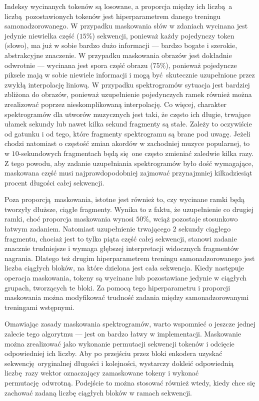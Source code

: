 Indeksy wycinanych tokenów są losowane, a proporcja między ich liczbą a liczbą pozostawionych tokenów jest hiperparametrem danego treningu samonadzorowanego. W przypadku maskowania słów w zdaniach \cite{devlin_bert_2019} wycinana jest jedynie niewielka część ($15\%$) sekwencji, ponieważ każdy pojedynczy token (słowo), ma już w sobie bardzo dużo informacji --- bardzo bogate i szerokie, abstrakcyjne znaczenie. W przypadku maskowania obrazów \cite{he_masked_2021} jest dokładnie odwrotnie --- wycinana jest spora część obrazu ($75\%$), ponieważ pojedyncze piksele mają w sobie niewiele informacji i mogą być skutecznie uzupełnione przez zwykłą interpolację liniową. W przypadku spektrogramów sytuacja jest bardziej zbliżona do obrazów, ponieważ uzupełnienie pojedynczych ramek również można zrealizować poprzez nieskomplikowaną interpolację. Co więcej, charakter spektrogramów dla utworów muzycznych jest taki, że często ich długie, trwające ułamek sekundy lub nawet kilka sekund fragmenty są stałe. Zależy to oczywiście od gatunku i od tego, które fragmenty spektrogramu są brane pod uwagę. Jeżeli chodzi natomiast o częstość zmian akordów w zachodniej muzyce popularnej, to w $10$-sekundowych fragmentach będą się one często zmieniać zaledwie kilka razy. Z tego powodu, aby zadanie uzupełniania spektrogramów było dość wymagające, maskowana część musi najprawdopodobniej zajmować przynajmniej kilkadziesiąt procent długości całej sekwencji.

Poza proporcją maskowania, istotne jest również to, czy wycinane ramki będą tworzyły dłuższe, ciągłe fragmenty. Wynika to z faktu, że uzupełnienie co drugiej ramki, choć proporcja maskowania wynosi $50\%$, wciąż pozostaje stosunkowo łatwym zadaniem. Natomiast uzupełnienie trwającego $2$ sekundy ciągłego fragmentu, chociaż jest to tylko piąta część całej sekwencji, stanowi zadanie znacznie trudniejsze i wymaga głębszej interpretacji widocznych fragmentów nagrania. Dlatego też drugim hiperparametrem treningu samonadzorowanego jest liczba ciągłych bloków, na które dzielona jest cała sekwencja. Kiedy następuje operacja maskowania, tokeny są wycinane lub pozostawiane jedynie w ciągłych grupach, tworzących te bloki. Za pomocą tego hiperparametru i proporcji maskowania można modyfikować trudność zadania między samonadzorowanymi treningami wstępnymi.

Omawiając zasady maskowania spektrogramów, warto wspomnieć o jeszcze jednej zalecie tego algorytmu --- jest on bardzo łatwy w implementacji. Maskowanie można zrealizować jako wykonanie permutacji sekwencji tokenów i odcięcie odpowiedniej ich liczby. Aby po przejściu przez bloki enkodera uzyskać sekwencję oryginalnej długości i kolejności, wystarczy dokleić odpowiednią liczbę razy wektor oznaczający zamaskowane tokeny i wykonać permutację odwrotną. Podejście to można stosować również wtedy, kiedy chce się zachować zadaną liczbę ciągłych bloków w ramach sekwencji.

